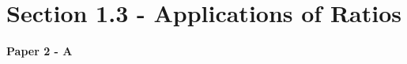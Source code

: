 \documentclass[12pt, a4paper]{article}
\begin{document}
\section*{Section 1.3 - Applications of Ratios}\label{section:2-1-3}

\textbf{Paper 2 - A}
\begin{enumx}[label=\arabic*.,start=25]
\item {}\label{DSE2013-CoreP2-Q12} 
\item {}\label{DSE2017-CoreP2-Q11} 
\item {}\label{DSE2020-CoreP2-Q10} 
\item {}\label{DSE2023-CoreP2-Q12} 
\end{enumx}
\end{document}
